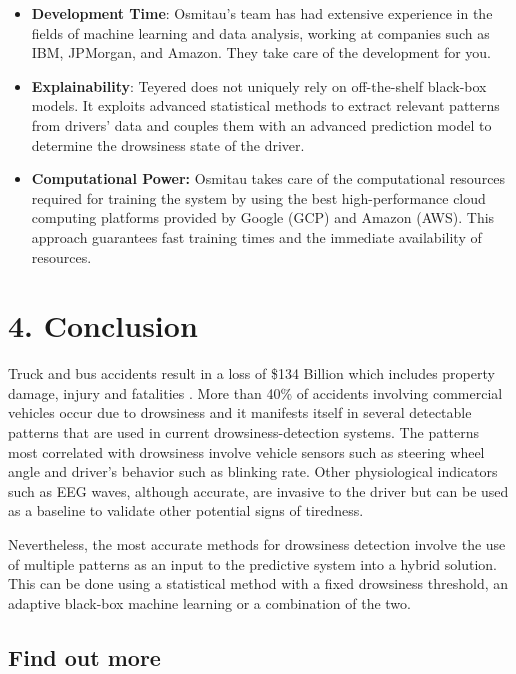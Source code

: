 \documentclass[a4paper]{article}
\begin{document}
\begin{itemize}
\item
  \textbf{Development Time}: Osmitau's team has had extensive experience
  in the fields of machine learning and data analysis, working at
  companies such as IBM, JPMorgan, and Amazon. They take care of the
  development for you.
\item
  \textbf{Explainability}: Teyered does not uniquely rely on
  off-the-shelf black-box models. It exploits advanced statistical
  methods to extract relevant patterns from drivers' data and couples
  them with an advanced prediction model to determine the drowsiness
  state of the driver.
\item
  \textbf{Computational Power:} Osmitau takes care of the computational
  resources required for training the system by using the best
  high-performance cloud computing platforms provided by Google (GCP)
  and Amazon (AWS). This approach guarantees fast training times and the
  immediate availability of resources.
\end{itemize}

\hypertarget{conclusion}{%
\section{4. Conclusion}\label{conclusion}}

Truck and bus accidents result in a loss of \$134 Billion which includes
property damage, injury and fatalities
\cite{federal_motor_carrier_safety_administration_pocket_2018}. More
than 40\% of accidents involving commercial vehicles occur due to
drowsiness \cite{flatley_sleep-related_2004} and it manifests itself in
several detectable patterns that are used in current
drowsiness-detection systems. The patterns most correlated with
drowsiness involve vehicle sensors such as steering wheel angle and
driver's behavior such as blinking rate. Other physiological indicators
such as EEG waves, although accurate, are invasive to the driver but can
be used as a baseline to validate other potential signs of tiredness.

Nevertheless, the most accurate methods for drowsiness detection involve
the use of multiple patterns as an input to the predictive system into a
hybrid solution. This can be done using a statistical method with a
fixed drowsiness threshold, an adaptive black-box machine learning or a
combination of the two.

\hypertarget{find-out-more}{%
\subsection{Find out more}\label{find-out-more}}
\end{document}

